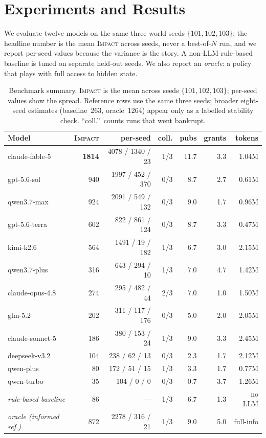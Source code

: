 \documentclass[11pt]{article}
\newcommand{\impact}{\textsc{Impact}}
\begin{document}
\section{Experiments and Results}
We evaluate twelve models on the same three world seeds $\{101,102,103\}$; the headline number is
the mean \impact{} across seeds, never a best-of-$N$ run, and we report per-seed values because
the variance is the story. A non-LLM rule-based baseline is tuned on separate held-out seeds. We
also report an \emph{oracle}: a policy that plays with full access to hidden state.

\begin{table}[t]
\centering
\small
\caption{Benchmark summary. \impact{} is the mean across seeds $\{101,102,103\}$; per-seed values
show the spread. Reference rows use the same three seeds; broader eight-seed estimates
(baseline~263, oracle~1264) appear only as a labelled stability check. ``coll.''\ counts runs that
went bankrupt.}
\label{tab:leaderboard}
\begin{tabular}{lrrrrrr}
\toprule
Model & \impact{} & per-seed & coll. & pubs & grants & tokens \\
\midrule
claude-fable-5   & \textbf{1814} & 4078 / 1340 / 23 & 1/3 & 11.7 & 3.3 & 1.04M \\
gpt-5.6-sol      & 940 & 1997 / 452 / 370 & 0/3 & 8.7 & 2.7 & 0.61M \\
qwen3.7-max      & 924 & 2091 / 549 / 132 & 0/3 & 9.0 & 1.7 & 0.96M \\
gpt-5.6-terra    & 602 & 822 / 861 / 124 & 0/3 & 8.7 & 3.3 & 0.47M \\
kimi-k2.6        & 564 & 1491 / 19 / 182 & 1/3 & 6.7 & 3.0 & 2.15M \\
qwen3.7-plus     & 316 & 643 / 294 / 10 & 1/3 & 7.0 & 4.7 & 1.42M \\
claude-opus-4.8  & 274 & 295 / 482 / 44 & 2/3 & 7.0 & 1.0 & 1.50M \\
glm-5.2          & 202 & 311 / 117 / 176 & 0/3 & 5.0 & 2.0 & 2.05M \\
claude-sonnet-5  & 186 & 380 / 153 / 24 & 1/3 & 9.0 & 3.3 & 2.45M \\
deepseek-v3.2    & 104 & 238 / 62 / 13 & 0/3 & 2.3 & 1.7 & 2.12M \\
qwen-plus        & 80 & 172 / 51 / 15 & 1/3 & 3.3 & 1.7 & 0.77M \\
qwen-turbo       & 35 & 104 / 0 / 0 & 0/3 & 0.7 & 3.7 & 1.26M \\
\midrule
\textit{rule-based baseline}    & 86 & --- & 1/3 & 6.7 & 1.3 & no LLM \\
\textit{oracle (informed ref.)} & 872 & 2278 / 316 / 21 & 1/3 & 9.0 & 5.0 & full-info \\
\bottomrule
\end{tabular}
\end{table}
\end{document}
